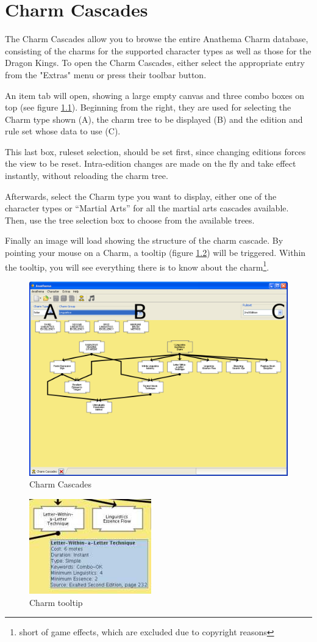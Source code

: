 \chapter{Charm Cascades}
The Charm Cascades allow you to browse the entire Anathema Charm database, consisting of the charms for the supported character types as well as those for the Dragon Kings. To open the Charm Cascades, either select the appropriate entry from the "Extras" menu or press their toolbar button.

An item tab will open, showing a large empty canvas and three combo boxes on top (see figure \ref{fig:CharmCascades}). Beginning from the right, they are used for selecting the Charm type shown (A), the charm tree to be displayed (B) and the edition and rule set whose data to use (C).

This last box, ruleset selection, should be set first, since changing editions forces the view to be reset. Intra-edition changes are made on the fly and take effect instantly, without reloading the charm tree.

Afterwards, select the Charm type you want to display, either one of the character types or ``Martial Arts'' for all the martial arts cascades available. Then, use the tree selection box to choose from the available trees.

Finally an image will load showing the structure of the charm cascade. By pointing your mouse on a Charm, a tooltip  (figure \ref{fig:CharmTooltip}) will be triggered. Within the tooltip, you will see everything there is to know about the charm\footnote{short of game effects, which are excluded due to copyright reasons}.

\begin{figure}[htbp]
	\centering
		\includegraphics[width=1.00\textwidth]{images/CharmCascades.png}
	\caption{Charm Cascades}
	\label{fig:CharmCascades}
\end{figure}


\begin{figure}[htbp]
	\centering
		\includegraphics{images/CharmTooltip.jpg}
	\caption{Charm tooltip}
	\label{fig:CharmTooltip}
\end{figure}